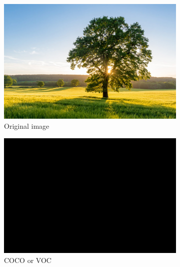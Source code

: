 \documentclass[12pt,a4paper]{report}
\newcommand{\acronym}{\MakeUppercase}
\begin{document}
	
	\begin{figure}[h!]
		\caption{Results given from outdoor input. Fully convolutional network, Pyramid 
		scene parsing network and DeepLab trained on \acronym{coco}, \acronym{pascal voc} 
		and \acronym{ade20k} dataset.}
		\centering
		\begin{subfigure}[b]{0.3\textwidth}
			\includegraphics[width=\textwidth]{out}
			\caption{Original image}
		\end{subfigure}
		\begin{subfigure}[b]{0.3\textwidth}
			\includegraphics[width=\textwidth]{out_coco_voc}
			\caption{\acronym{coco} or \acronym{voc}}
		\end{subfigure}
		\\
		\begin{subfigure}[b]{0.3\textwidth}

\end{subfigure}
\end{figure}
\end{document}
